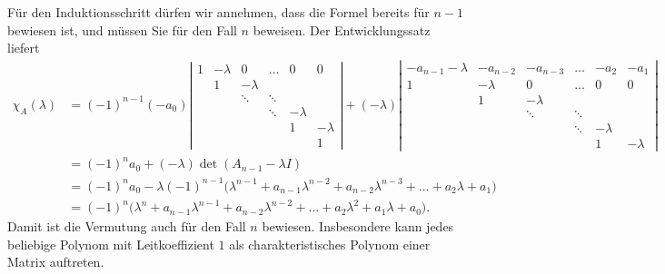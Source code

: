 \begin{loesung}
Für den Induktionsschritt dürfen wir annehmen, dass die Formel bereits
für $n-1$ bewiesen ist, und müssen Sie für den Fall $n$ beweisen.
Der Entwicklungssatz liefert
\begin{align*}
\chi_A(\lambda)
&=
(-1)^{n-1}(-a_0)\left|\begin{matrix}
   1            &-\lambda&   0    &\dots &   0    &   0    \\
                &   1    &-\lambda&      &        &        \\
                &        &\ddots  &\ddots&        &        \\
                &        &        &\ddots&-\lambda&        \\
                &        &        &      &   1    &-\lambda\\
                &        &        &      &        &   1    
\end{matrix}\right|
+(-\lambda)\left|\begin{matrix}
-a_{n-1}-\lambda&-a_{n-2}&-a_{n-3}&\dots & -a_2   & -a_1   \\
   1            &-\lambda&   0    &\dots &   0    &   0    \\
                &   1    &-\lambda&      &        &        \\
                &        &\ddots  &\ddots&        &        \\
                &        &        &\ddots&-\lambda&        \\
                &        &        &      &   1    &-\lambda
\end{matrix}\right|
\\
&=(-1)^n a_0 + (-\lambda)\det(A_{n-1}-\lambda I)
\\
&=(-1)^n a_0 -\lambda (-1)^{n-1}
\bigl(
\lambda^{n-1}+a_{n-1}\lambda^{n-2}+a_{n-2}\lambda^{n-3}+\dots+a_2\lambda+a_1
\bigr)
\\
&=(-1)^n\bigl(
\lambda^n+a_{n-1}\lambda^{n-1}+a_{n-2}\lambda^{n-2}+\dots+a_2\lambda^2+a_1\lambda+a_0
\bigr).
\end{align*}
Damit ist die Vermutung auch für den Fall $n$ bewiesen.
Insbesondere kann jedes beliebige Polynom mit Leitkoeffizient $1$
als charakteristisches Polynom einer Matrix auftreten.
\end{loesung}

